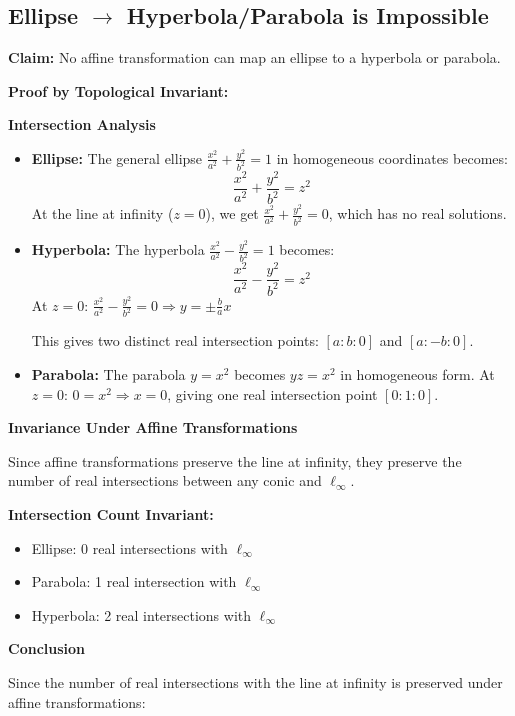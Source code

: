 \documentclass[12pt]{article}
\begin{document}
\subsection*{Ellipse $\rightarrow$ Hyperbola/Parabola is Impossible}

\textbf{Claim:} No affine transformation can map an ellipse to a hyperbola or parabola.

\textbf{Proof by Topological Invariant:}

\textbf{Intersection Analysis}
\begin{itemize}
    \item \textbf{Ellipse:} The general ellipse $\frac{x^2}{a^2} + \frac{y^2}{b^2} = 1$ in homogeneous coordinates becomes:
    \[
    \frac{x^2}{a^2} + \frac{y^2}{b^2} = z^2
    \]
    At the line at infinity ($z = 0$), we get $\frac{x^2}{a^2} + \frac{y^2}{b^2} = 0$, which has no real solutions.
    
    \item \textbf{Hyperbola:} The hyperbola $\frac{x^2}{a^2} - \frac{y^2}{b^2} = 1$ becomes:
    \[
    \frac{x^2}{a^2} - \frac{y^2}{b^2} = z^2
    \]
    At $z = 0$: $\frac{x^2}{a^2} - \frac{y^2}{b^2} = 0 \Rightarrow y = \pm\frac{b}{a}x$
    
    This gives two distinct real intersection points: $[a:b:0]$ and $[a:-b:0]$.
    
    \item \textbf{Parabola:} The parabola $y = x^2$ becomes $yz = x^2$ in homogeneous form.
    At $z = 0$: $0 = x^2 \Rightarrow x = 0$, giving one real intersection point $[0:1:0]$.
\end{itemize}

\textbf{Invariance Under Affine Transformations}

Since affine transformations preserve the line at infinity, they preserve the number of real intersections between any conic and $\ell_\infty$.

\textbf{Intersection Count Invariant:}
\begin{itemize}
    \item Ellipse: 0 real intersections with $\ell_\infty$
    \item Parabola: 1 real intersection with $\ell_\infty$  
    \item Hyperbola: 2 real intersections with $\ell_\infty$
\end{itemize}

\textbf{Conclusion}

Since the number of real intersections with the line at infinity is preserved under affine transformations:
\end{document}
